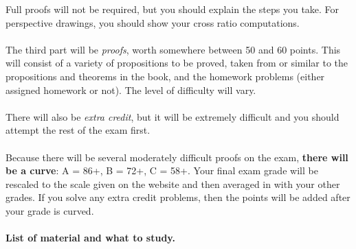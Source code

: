\documentclass[12pt]{article}
\begin{document}
Full proofs will not be required, but you should explain the steps you take. For perspective drawings, you should show your cross ratio computations.
\\
\\
The third part will be {\itshape proofs}, worth somewhere between 50 and 60 points. This will consist of a variety of
propositions to be proved, taken from or similar to the propositions and theorems in the book, and the homework problems
(either assigned homework or not). The level of difficulty will vary.
\\
\\
There will also be {\itshape extra credit}, but it will be extremely difficult and you should attempt the rest of the exam first.
\\
\\
Because there will be several moderately difficult proofs on the exam, {\bf there will be a curve}: A = 86+, B = 72+, C = 58+.
Your final exam grade will be rescaled to the scale given on the website and then averaged in with your other grades. If you solve
any extra credit problems, then the points will be added after your grade is curved.
\\
\\
{\bf List of material and what to study.}
\end{document}
